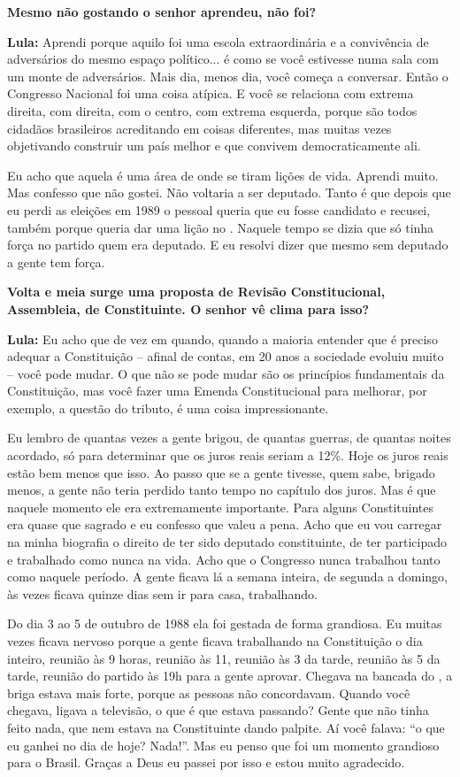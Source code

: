 \textbf{Mesmo não gostando o senhor aprendeu, não foi?}

\textbf{Lula:} Aprendi porque aquilo foi uma escola extraordinária e a
convivência de adversários do mesmo espaço político... é como se você
estivesse numa sala com um monte de adversários. Mais dia, menos dia,
você começa a conversar. Então o Congresso Nacional foi uma coisa
atípica. E você se relaciona com extrema direita, com direita, com o
centro, com extrema esquerda, porque são todos cidadãos brasileiros
acreditando em coisas diferentes, mas muitas vezes objetivando construir
um país melhor e que convivem democraticamente ali.

Eu acho que aquela é uma área de onde se tiram lições de vida. Aprendi
muito. Mas confesso que não gostei. Não voltaria a ser deputado. Tanto é
que depois que eu perdi as eleições em 1989 o pessoal queria que eu
fosse candidato e recusei, também porque queria dar uma lição no .
Naquele tempo se dizia que só tinha força no partido quem era deputado.
E eu resolvi dizer que mesmo sem deputado a gente tem força.

\textbf{Volta e meia surge uma proposta de Revisão Constitucional,
Assembleia, de Constituinte. O senhor vê clima para isso?}

\textbf{Lula:} Eu acho que de vez em quando, quando a maioria entender
que é preciso adequar a Constituição -- afinal de contas, em 20 anos a
sociedade evoluiu muito -- você pode mudar. O que não se pode mudar são
os princípios fundamentais da Constituição, mas você fazer uma Emenda
Constitucional para melhorar, por exemplo, a questão do tributo, é uma
coisa impressionante.

Eu lembro de quantas vezes a gente brigou, de quantas guerras, de
quantas noites acordado, só para determinar que os juros reais seriam a
12\%. Hoje os juros reais estão bem menos que isso. Ao passo que se a
gente tivesse, quem sabe, brigado menos, a gente não teria perdido tanto
tempo no capítulo dos juros. Mas é que naquele momento ele era
extremamente importante. Para alguns Constituintes era quase que sagrado
e eu confesso que valeu a pena. Acho que eu vou carregar na minha
biografia o direito de ter sido deputado constituinte, de ter
participado e trabalhado como nunca na vida. Acho que o Congresso nunca
trabalhou tanto como naquele período. A gente ficava lá a semana
inteira, de segunda a domingo, às vezes ficava quinze dias sem ir para
casa, trabalhando.

Do dia 3 ao 5 de outubro de 1988 ela foi gestada de forma grandiosa. Eu
muitas vezes ficava nervoso porque a gente ficava trabalhando na
Constituição o dia inteiro, reunião às 9 horas, reunião às 11, reunião
às 3 da tarde, reunião às 5 da tarde, reunião do partido às 19h para a
gente aprovar. Chegava na bancada do , a briga estava mais forte,
porque as pessoas não concordavam. Quando você chegava, ligava a
televisão, o que é que estava passando? Gente que não tinha feito nada,
que nem estava na Constituinte dando palpite. Aí você falava: ``o que eu
ganhei no dia de hoje? Nada!''. Mas eu penso que foi um momento
grandioso para o Brasil. Graças a Deus eu passei por isso e estou muito
agradecido.

